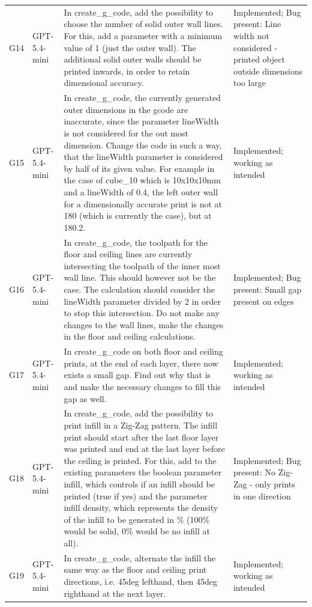 \documentclass[10pt,twocolumn,a4paper]{article}
\begin{document}
\begin{longtable}{@{}p{0.6cm}p{1.5cm}p{11.0cm}p{2.7cm}@{}}
\addlinespace
G14 & GPT-5.4-mini & In create\_g\_code, add the possibility to choose the number of solid outer wall lines. For this, add a parameter with a minimum value of 1 (just the outer wall). The additional solid outer walls should be printed inwards, in order to retain dimensional accuracy. & Implemented; Bug present: Line width not considered - printed object outside dimensions too large \\
\addlinespace
G15 & GPT-5.4-mini & In create\_g\_code, the currently generated outer dimensions in the gcode are inaccurate, since the parameter lineWidth is not considered for the out most dimension. Change the code in such a way, that the lineWidth parameter is considered by half of its given value. For example in the case of cube\_10 which is 10x10x10mm and a lineWidth of 0.4, the left outer wall for a dimensionally accurate print is not at 180 (which is currently the case), but at 180.2. & Implemented; working as intended \\
\addlinespace
G16 & GPT-5.4-mini & In create\_g\_code, the toolpath for the floor and ceiling lines are currently intersecting the toolpath of the inner most wall line. This should however not be the case. The calculation should consider the lineWidth parameter divided by 2 in order to stop this intersection. Do not make any changes to the wall lines, make the changes in the floor and ceiling calculations. & Implemented; Bug present: Small gap present on edges \\
\addlinespace
G17 & GPT-5.4-mini & In create\_g\_code on both floor and ceiling prints, at the end of each layer, there now exists a small gap. Find out why that is and make the necessary changes to fill this gap as well. & Implemented; working as intended \\
\addlinespace
G18 & GPT-5.4-mini & In create\_g\_code, add the possibility to print infill in a Zig-Zag pattern. The infill print should start after the last floor layer was printed and end at the last layer before the ceiling is printed. For this, add to the existing parameters the boolean parameter infill, which controls if an infill should be printed (true if yes) and the parameter infill density, which represents the density of the infill to be generated in \% (100\% would be solid, 0\% would be no infill at all). & Implemented; Bug present: No Zig-Zag - only prints in one direction \\
\addlinespace
G19 & GPT-5.4-mini & In create\_g\_code, alternate the infill the same way as the floor and ceiling print directions, i.e. 45deg lefthand, then 45deg righthand at the next layer. & Implemented; working as intended \\

\end{longtable}
\end{document}
